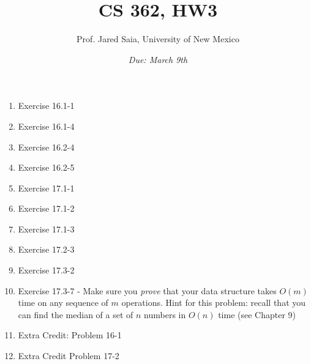 \documentclass[11pt]{article}
\begin{document}
\title{CS 362, HW3}

\author {Prof. Jared Saia, University of New Mexico}

\date{\emph{Due: March 9th}}
\maketitle

\begin{enumerate}

\item Exercise 16.1-1


\item Exercise 16.1-4


\item Exercise 16.2-4

\item Exercise 16.2-5

\item Exercise 17.1-1

\item Exercise 17.1-2

\item Exercise 17.1-3


\item Exercise 17.2-3

\item Exercise 17.3-2

\item Exercise 17.3-7 - Make sure you \emph{prove} that your data
structure takes $O(m)$ time on any sequence of $m$ operations.  Hint
for this problem: recall that you can find the median of a set of $n$
numbers in $O(n)$ time (see Chapter 9)


\item Extra Credit: Problem 16-1

\item Extra Credit Problem 17-2

\end{enumerate}
\end{document}
